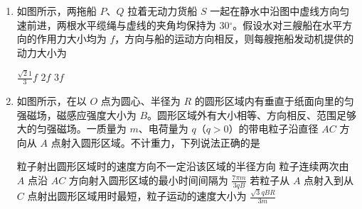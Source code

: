 \documentclass[\gkver]{gaokaozhenti}
\begin{document}
\begin{enumerate}

\item
如图所示，两拖船 $ P $、$ Q $ 拉着无动力货船 $ S $ 一起在静水中沿图中虚线方向匀速前进，两根水平缆绳与虚线的夹角均保持为 $ 30 {^\circ} $。假设水对三艘船在水平方向的作用力大小均为 $ f $，方向与船的运动方向相反，则每艘拖船发动机提供的动力大小为 

{$ \frac{{\sqrt 21 }}{3}f $}
{$ 2 f $}
{$ 3 f $}



\item
如图所示，在以 $ O $ 点为圆心、半径为 $ R $ 的圆形区域内有垂直于纸面向里的匀强磁场，磁感应强度大小为 $ B $。圆形区域外有大小相等、方向相反、范围足够大的匀强磁场。一质量为 $ m $、电荷量为 $ q $（$ q >0 $）的带电粒子沿直径 $ AC $ 方向从 $ A $ 点射入圆形区域。不计重力，下列说法正确的是 

{粒子射出圆形区域时的速度方向不一定沿该区域的半径方向}
{粒子连续两次由 $ A $ 点沿 $ AC $ 方向射入圆形区域的最小时间间隔为 $ \frac{{7\pi m}}{{3qB}} $}
{若粒子从 $ A $ 点射入到从 $ C $ 点射出圆形区域用时最短，粒子运动的速度大小为 $ \frac{\sqrt{3} qBR}{3m} $}


\end{enumerate}
\end{document}
